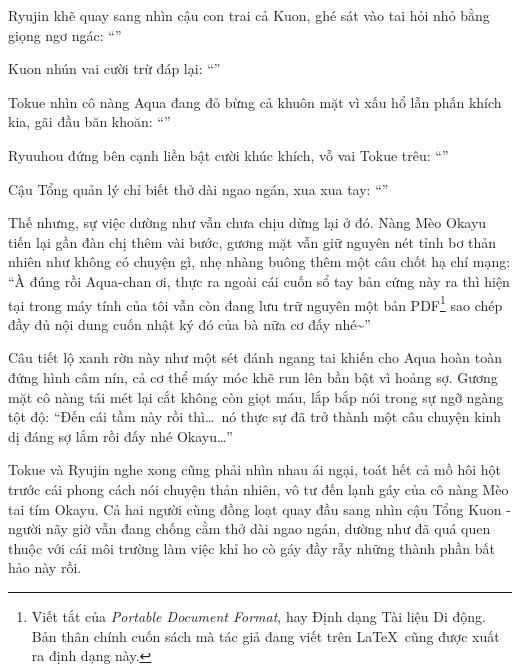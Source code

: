 \documentclass[../main.tex]{subfiles}
\begin{document}
Ryujin khẽ quay sang nhìn cậu con trai cả Kuon, ghé sát vào tai hỏi nhỏ bằng giọng ngơ ngác: ``''

Kuon nhún vai cười trừ đáp lại: ``''

Tokue nhìn cô nàng Aqua đang đỏ bừng cả khuôn mặt vì xấu hổ lẫn phấn khích kia, gãi đầu băn khoăn: ``''

Ryuuhou đứng bên cạnh liền bật cười khúc khích, vỗ vai Tokue trêu: ``''

Cậu Tổng quản lý chỉ biết thở dài ngao ngán, xua xua tay: ``''

Thế nhưng, sự việc dường như vẫn chưa chịu dừng lại ở đó. Nàng Mèo Okayu tiến lại gần đàn chị thêm vài bước, gương mặt vẫn giữ nguyên nét tỉnh bơ thản nhiên như không có chuyện gì, nhẹ nhàng buông thêm một câu chốt hạ chí mạng: ``À đúng rồi Aqua-chan ơi, thực ra ngoài cái cuốn sổ tay bản cứng này ra thì hiện tại trong máy tính của tôi vẫn còn đang lưu trữ nguyên một bản PDF\footnote{Viết tắt của \textit{Portable Document Format}, hay Định dạng Tài liệu Di động. Bản thân chính cuốn sách mà tác giả đang viết trên \LaTeX\ cũng được xuất ra định dạng này.} sao chép đầy đủ nội dung cuốn nhật ký đó của bà nữa cơ đấy nhé\~{}''

Câu tiết lộ xanh rờn này như một sét đánh ngang tai khiến cho Aqua hoàn toàn đứng hình câm nín, cả cơ thể máy móc khẽ run lên bần bật vì hoảng sợ. Gương mặt cô nàng tái mét lại cắt không còn giọt máu, lắp bắp nói trong sự ngỡ ngàng tột độ: ``Đến cái tầm này rồi thì\dots\ nó thực sự đã trở thành một câu chuyện kinh dị đáng sợ lắm rồi đấy nhé Okayu\dots''

Tokue và Ryujin nghe xong cũng phải nhìn nhau ái ngại, toát hết cả mồ hôi hột trước cái phong cách nói chuyện thản nhiên, vô tư đến lạnh gáy của cô nàng Mèo tai tím Okayu. Cả hai người cùng đồng loạt quay đầu sang nhìn cậu Tổng Kuon - người nãy giờ vẫn đang chống cằm thở dài ngao ngán, dường như đã quá quen thuộc với cái môi trường làm việc khỉ ho cò gáy đầy rẫy những thành phần bất hảo này rồi.
\end{document}
